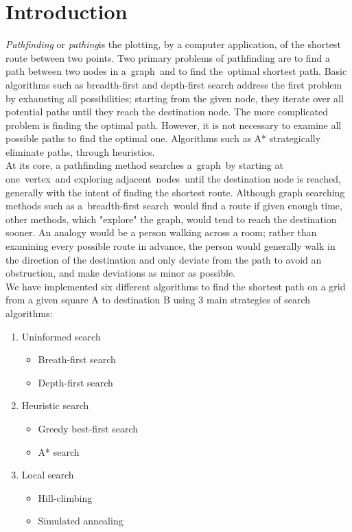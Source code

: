 \documentclass[a4paper]{article}
\begin{document}
\section{Introduction}

\emph{Pathfinding} or \emph{pathing}is the plotting, by a computer application, of the shortest route between two points. Two primary problems of pathfinding are to find a path between two nodes in a graph and to find the optimal shortest path. Basic algorithms such as breadth-first and depth-first search address the first problem by exhausting all possibilities; starting from the given node, they iterate over all potential paths until they reach the destination node. The more complicated problem is finding the optimal path. However, it is not necessary to examine all possible paths to find the optimal one. Algorithms such as A* strategically eliminate paths, through heuristics.\\

\noindent At its core, a pathfinding method searches a graph by starting at one vertex and exploring adjacent nodes until the destination node is reached, generally with the intent of finding the shortest route. Although graph searching methods such as a breadth-first search would find a route if given enough time, other methods, which "explore" the graph, would tend to reach the destination sooner. An analogy would be a person walking across a room; rather than examining every possible route in advance, the person would generally walk in the direction of the destination and only deviate from the path to avoid an obstruction, and make deviations as minor as possible.\\

\noindent We have implemented six different algorithms to find the shortest path on a grid from a given square A to destination B using 3 main strategies of search algorithms:\\

\begin{enumerate}
\item Uninformed search
	\begin{itemize}
		\item Breath-first search
		\item Depth-first search
	\end{itemize}
\item Heuristic search
	\begin{itemize}
		\item Greedy best-first search
		\item A* search
	\end{itemize}
\item Local search
	\begin{itemize}
		\item Hill-climbing
		\item Simulated annealing
	\end{itemize}
\end{enumerate}
\end{document}
